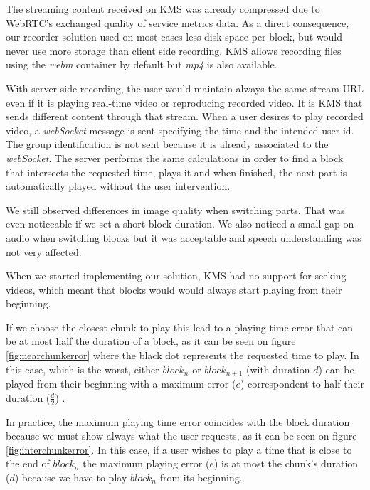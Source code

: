 The streaming content received on \ac{KMS} was already compressed due to \ac{WebRTC}'s exchanged quality of service metrics data. As a direct consequence, our recorder solution used on most cases less disk space per block, but would never use more storage than client side recording. \ac{KMS} allows recording files using the \emph{webm} container by default but \emph{mp4} is also available.

	With server side recording, the user would maintain always the same stream \ac{URL} even if it is playing real-time video or reproducing recorded video. It is \ac{KMS} that sends different content through that stream. When a user desires to play recorded video, a \emph{webSocket} message is sent specifying the time and the intended user id. The group identification is not sent because it is already associated to the \emph{webSocket}. The server performs the same calculations in order to find a block that intersects the requested time, plays it and when finished, the next part is automatically played without the user intervention.

	We still observed differences in image quality when switching parts. That was even noticeable if we set a short block duration. We also noticed a small gap on audio when switching blocks but it was acceptable and speech understanding was not very affected. 

	When we started implementing our solution, \ac{KMS} had no support for seeking videos, which meant that blocks would would always start playing from their beginning. 

	If we choose the closest chunk to play this lead to a playing time error that can be at most half the duration of a block, as it can be seen on figure \ref{fig:nearchunkerror} where the black dot represents the requested time to play. In this case, which is the worst, either $ block_{n}$ or $ block_{n+1}$ (with duration $d$) can be played from their beginning with a maximum error ($e$) correspondent to half their duration ($\frac{d}{2}$) . 


	In practice, the maximum playing time error coincides with the block duration because we must show always what the user requests, as it can be seen on figure \ref{fig:interchunkerror}. In this case, if a user wishes to play a time that is close to the end of $block_n$ the maximum playing error ($e$) is at most the chunk's duration ($d$) because we have to play $block_n$ from its beginning.


